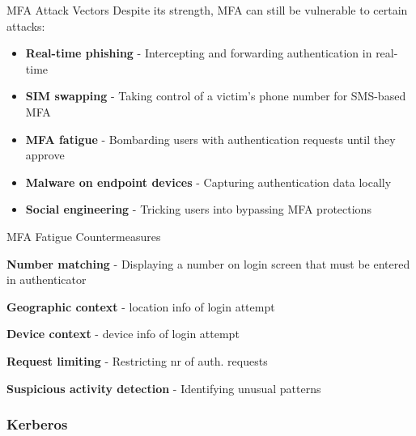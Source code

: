 \begin{theorem}{MFA Attack Vectors}
Despite its strength, MFA can still be vulnerable to certain attacks:
\begin{itemize}
    \item \textbf{Real-time phishing} - Intercepting and forwarding authentication in real-time
    \item \textbf{SIM swapping} - Taking control of a victim's phone number for SMS-based MFA
    \item \textbf{MFA fatigue} - Bombarding users with authentication requests until they approve
    \item \textbf{Malware on endpoint devices} - Capturing authentication data locally
    \item \textbf{Social engineering} - Tricking users into bypassing MFA protections
\end{itemize}
\end{theorem}

\begin{concept}{MFA Fatigue Countermeasures}

     \textbf{Number matching} - Displaying a number on login screen that must be entered in authenticator

     \textbf{Geographic context} - location info of login attempt

     \textbf{Device context} - device info of  login attempt

     \textbf{Request limiting} - Restricting nr of auth. requests

     \textbf{Suspicious activity detection} - Identifying unusual patterns

\end{concept}

\multend








\subsubsection{Kerberos}


